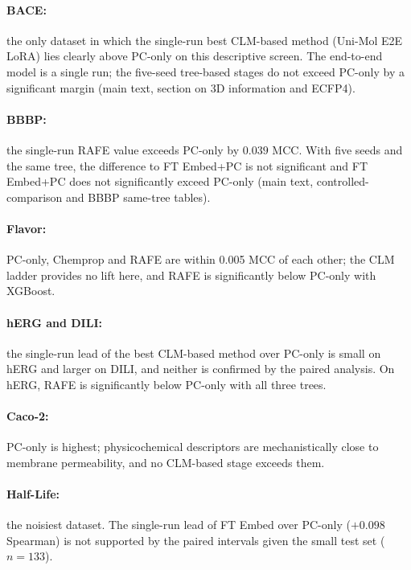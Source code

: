 \documentclass[9pt,a4paper]{article}
\begin{document}
\paragraph{BACE:} the only dataset in which the single-run best CLM-based method (Uni-Mol E2E LoRA) lies clearly above PC-only on this descriptive screen. The end-to-end model is a single run; the five-seed tree-based stages do not exceed PC-only by a significant margin (main text, section on 3D information and ECFP4).

\paragraph{BBBP:} the single-run RAFE value exceeds PC-only by $0.039$ MCC. With five seeds and the same tree, the difference to FT Embed+PC is not significant and FT Embed+PC does not significantly exceed PC-only (main text, controlled-comparison and BBBP same-tree tables).

\paragraph{Flavor:} PC-only, Chemprop and RAFE are within 0.005 MCC of each other; the CLM ladder provides no lift here, and RAFE is significantly below PC-only with XGBoost.

\paragraph{hERG and DILI:} the single-run lead of the best CLM-based method over PC-only is small on hERG and larger on DILI, and neither is confirmed by the paired analysis. On hERG, RAFE is significantly below PC-only with all three trees.

\paragraph{Caco-2:} PC-only is highest; physicochemical descriptors are mechanistically close to membrane permeability, and no CLM-based stage exceeds them.

\paragraph{Half-Life:} the noisiest dataset. The single-run lead of FT Embed over PC-only ($+0.098$ Spearman) is not supported by the paired intervals given the small test set ($n=133$).

\end{document}
